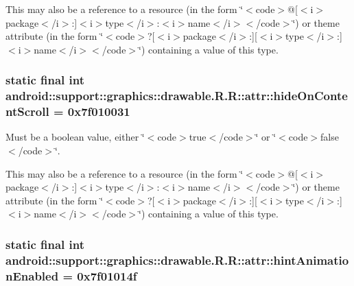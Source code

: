This may also be a reference to a resource (in the form \char`\"{}$<$code$>$@\mbox{[}$<$i$>$package$<$/i$>$:\mbox{]}$<$i$>$type$<$/i$>$:$<$i$>$name$<$/i$>$$<$/code$>$\char`\"{}) or theme attribute (in the form \char`\"{}$<$code$>$?\mbox{[}$<$i$>$package$<$/i$>$:\mbox{]}\mbox{[}$<$i$>$type$<$/i$>$:\mbox{]}$<$i$>$name$<$/i$>$$<$/code$>$\char`\"{}) containing a value of this type. \hypertarget{classandroid_1_1support_1_1graphics_1_1drawable_1_1_r_1_1attr_dde553648d872a91e7b9d3447bd7a997}{
\subsubsection[{hideOnContentScroll}]{\setlength{\rightskip}{0pt plus 5cm}static final int android::support::graphics::drawable.R.R::attr::hideOnContentScroll = 0x7f010031}}
\label{classandroid_1_1support_1_1graphics_1_1drawable_1_1_r_1_1attr_dde553648d872a91e7b9d3447bd7a997}


Must be a boolean value, either \char`\"{}$<$code$>$true$<$/code$>$\char`\"{} or \char`\"{}$<$code$>$false$<$/code$>$\char`\"{}. 

This may also be a reference to a resource (in the form \char`\"{}$<$code$>$@\mbox{[}$<$i$>$package$<$/i$>$:\mbox{]}$<$i$>$type$<$/i$>$:$<$i$>$name$<$/i$>$$<$/code$>$\char`\"{}) or theme attribute (in the form \char`\"{}$<$code$>$?\mbox{[}$<$i$>$package$<$/i$>$:\mbox{]}\mbox{[}$<$i$>$type$<$/i$>$:\mbox{]}$<$i$>$name$<$/i$>$$<$/code$>$\char`\"{}) containing a value of this type. \hypertarget{classandroid_1_1support_1_1graphics_1_1drawable_1_1_r_1_1attr_6fc42993be46615f85cb36ec0efdc98e}{
\subsubsection[{hintAnimationEnabled}]{\setlength{\rightskip}{0pt plus 5cm}static final int android::support::graphics::drawable.R.R::attr::hintAnimationEnabled = 0x7f01014f}}
\label{classandroid_1_1support_1_1graphics_1_1drawable_1_1_r_1_1attr_6fc42993be46615f85cb36ec0efdc98e}


